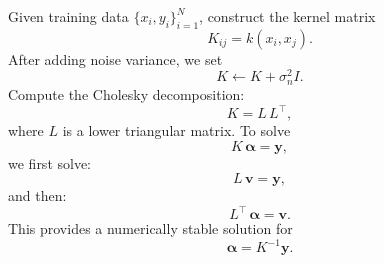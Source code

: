 \documentclass[11pt]{article}
\begin{document}

Given training data $\{x_i,y_i\}_{i=1}^N$, construct the kernel matrix
\[
K_{ij}=k(x_i,x_j).
\]
After adding noise variance, we set
\[
K\leftarrow K+\sigma_n^2 I.
\]
Compute the Cholesky decomposition:
\[
K=L\,L^\top,
\]
where $L$ is a lower triangular matrix. To solve
\[
K\,\bm{\alpha}=\bm{y},
\]
we first solve:
\[
L\,\bm{v}=\bm{y},
\]
and then:
\[
L^\top\,\bm{\alpha}=\bm{v}.
\]
This provides a numerically stable solution for
\[
\bm{\alpha}=K^{-1}\bm{y}.
\]

\end{document}
